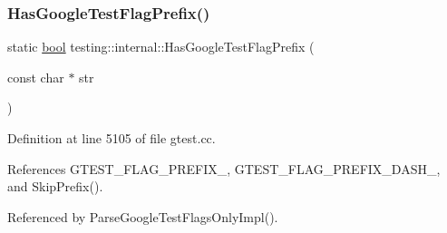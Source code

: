 \subsubsection{\texorpdfstring{Has\+Google\+Test\+Flag\+Prefix()}{HasGoogleTestFlagPrefix()}}
{\footnotesize\ttfamily static \hyperlink{classbool}{bool} testing\+::internal\+::\+Has\+Google\+Test\+Flag\+Prefix (\begin{DoxyParamCaption}\item[{const char $\ast$}]{str }\end{DoxyParamCaption})\hspace{0.3cm}{\ttfamily [static]}}



Definition at line 5105 of file gtest.\+cc.



References G\+T\+E\+S\+T\+\_\+\+F\+L\+A\+G\+\_\+\+P\+R\+E\+F\+I\+X\+\_\+, G\+T\+E\+S\+T\+\_\+\+F\+L\+A\+G\+\_\+\+P\+R\+E\+F\+I\+X\+\_\+\+D\+A\+S\+H\+\_\+, and Skip\+Prefix().



Referenced by Parse\+Google\+Test\+Flags\+Only\+Impl().


